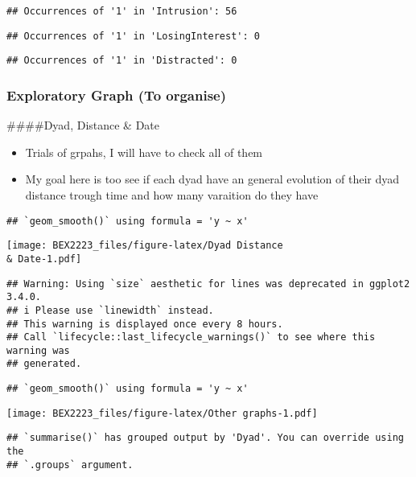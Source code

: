 \documentclass[
]{article}
\begin{document}
\begin{verbatim}
## Occurrences of '1' in 'Intrusion': 56
\end{verbatim}

\begin{verbatim}
## Occurrences of '1' in 'LosingInterest': 0
\end{verbatim}

\begin{verbatim}
## Occurrences of '1' in 'Distracted': 0
\end{verbatim}

\hypertarget{exploratory-graph-to-organise}{%
\subsubsection{Exploratory Graph (To
organise)}\label{exploratory-graph-to-organise}}

\#\#\#\#Dyad, Distance \& Date

\begin{itemize}
\item
  Trials of grpahs, I will have to check all of them
\item
  My goal here is too see if each dyad have an general evolution of
  their dyad distance trough time and how many varaition do they have
\end{itemize}

\begin{verbatim}
## `geom_smooth()` using formula = 'y ~ x'
\end{verbatim}

\texttt{[image: BEX2223\_files/figure-latex/Dyad Distance \\\& Date-1.pdf]}

\begin{verbatim}
## Warning: Using `size` aesthetic for lines was deprecated in ggplot2 3.4.0.
## i Please use `linewidth` instead.
## This warning is displayed once every 8 hours.
## Call `lifecycle::last_lifecycle_warnings()` to see where this warning was
## generated.
\end{verbatim}

\begin{verbatim}
## `geom_smooth()` using formula = 'y ~ x'
\end{verbatim}

\texttt{[image: BEX2223\_files/figure-latex/Other graphs-1.pdf]}

\begin{verbatim}
## `summarise()` has grouped output by 'Dyad'. You can override using the
## `.groups` argument.
\end{verbatim}
\end{document}
